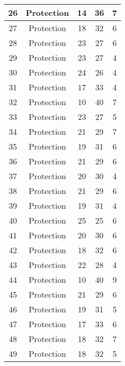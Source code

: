 \documentclass[results.tex]{subfiles}
\begin{document}
\begin{center}
\begin{tabular}{| c || c | c | c | c |}
    \hline
    26 & Protection & 14 & 36 & 7 \\ 
    \hline
    27 & Protection & 18 & 32 & 6 \\ 
    \hline
    28 & Protection & 23 & 27 & 6 \\ 
    \hline
    29 & Protection & 23 & 27 & 4 \\ 
    \hline
    30 & Protection & 24 & 26 & 4 \\ 
    \hline
    31 & Protection & 17 & 33 & 4 \\ 
    \hline
    32 & Protection & 10 & 40 & 7 \\ 
    \hline
    33 & Protection & 23 & 27 & 5 \\ 
    \hline
    34 & Protection & 21 & 29 & 7 \\ 
    \hline
    35 & Protection & 19 & 31 & 6 \\ 
    \hline
    36 & Protection & 21 & 29 & 6 \\ 
    \hline
    37 & Protection & 20 & 30 & 4 \\ 
    \hline
    38 & Protection & 21 & 29 & 6 \\ 
    \hline
    39 & Protection & 19 & 31 & 4 \\ 
    \hline
    40 & Protection & 25 & 25 & 6 \\ 
    \hline
    41 & Protection & 20 & 30 & 6 \\ 
    \hline
    42 & Protection & 18 & 32 & 6 \\ 
    \hline
    43 & Protection & 22 & 28 & 4 \\ 
    \hline
    44 & Protection & 10 & 40 & 9 \\ 
    \hline
    45 & Protection & 21 & 29 & 6 \\ 
    \hline
    46 & Protection & 19 & 31 & 5 \\ 
    \hline
    47 & Protection & 17 & 33 & 6 \\ 
    \hline
    48 & Protection & 18 & 32 & 7 \\ 
    \hline
    49 & Protection & 18 & 32 & 5 \\ 
    \hline   \end{tabular}
\end{center}
\end{document}
